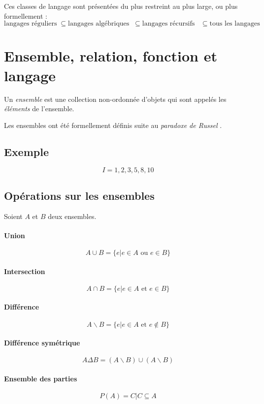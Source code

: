 \documentclass[12pt, a4paper]{report}
\begin{document}
Ces classes de langage sont présentées du plus restreint au plus large, ou plus formellement :
\[
\text{langages réguliers}
\;\subseteq\text{langages algébriques}
\;\;\subseteq\text{langages récursifs}
\;\;\;\subseteq\text{tous les langages}
\]

\section{Ensemble, relation, fonction et langage}


Un \textit{ensemble} est une collection non-ordonnée d'objets qui sont
appelés les \textit{éléments} de l'ensemble.

Les ensembles ont été formellement définis suite au \textit{paradoxe
  de Russel} .

\subsection{Exemple}

\[
I = {1, 2, 3, 5, 8, 10}
\]


\subsection{Opérations sur les ensembles}

Soient $A$ et $B$ deux ensembles.

\paragraph{Union}
\[ A \cup B = \{ e | e \in A \textrm{ ou } e \in B \} \]

\paragraph{Intersection}
\[ A \cap B = \{ e | e \in A \textrm{ et } e \in B \} \]

\paragraph{Différence}
\[ A \backslash B = \{ e | e \in A \textrm{ et } e \not\in B \} \]

\paragraph{Différence symétrique}
\[ A \Delta B = (A \backslash B)\cup (A \backslash B) \]

\paragraph{Ensemble des parties}
\[ P(A) = { C | C \subseteq A} \]
\end{document}
